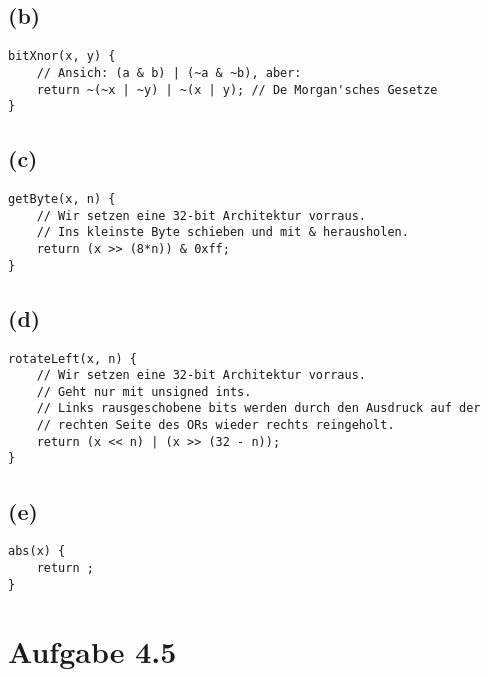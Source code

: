 \documentclass[12pt]{article}
\begin{document}
\subsection{(b)}
\begin{verbatim}
bitXnor(x, y) {
    // Ansich: (a & b) | (~a & ~b), aber:
    return ~(~x | ~y) | ~(x | y); // De Morgan'sches Gesetze
}
\end{verbatim}

\subsection{(c)}
\begin{verbatim}
getByte(x, n) {
    // Wir setzen eine 32-bit Architektur vorraus.
    // Ins kleinste Byte schieben und mit & herausholen.
    return (x >> (8*n)) & 0xff;
}
\end{verbatim}

\subsection{(d)}
\begin{verbatim}
rotateLeft(x, n) {
    // Wir setzen eine 32-bit Architektur vorraus.
    // Geht nur mit unsigned ints.
    // Links rausgeschobene bits werden durch den Ausdruck auf der
    // rechten Seite des ORs wieder rechts reingeholt.
    return (x << n) | (x >> (32 - n));
}
\end{verbatim}

\subsection{(e)}
\begin{verbatim}
abs(x) {
    return ;
}
\end{verbatim}

\section{Aufgabe 4.5}


\begin{align}
\end{align}
\end{document}
